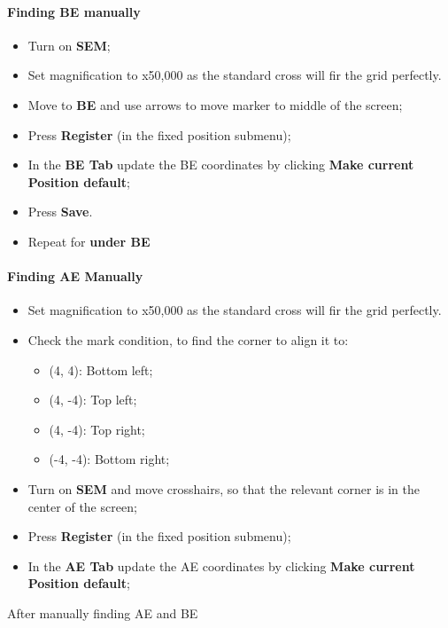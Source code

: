 \paragraph{Finding BE manually}
\begin{itemize}
\item Turn on \textbf{SEM};
  \item Set magnification to x50,000 as the standard cross will fir the grid perfectly.
\item Move to \textbf{BE} and use arrows to move marker to middle of the screen;
\item Press \textbf{Register} (in the fixed position submenu);
\item In the \textbf{BE Tab} update  the BE coordinates by clicking \textbf{Make
    current Position default};
\item Press \textbf{Save}.
\item Repeat for \textbf{under BE}
\end{itemize}

\paragraph{Finding AE Manually}

\begin{itemize}
\item Set magnification to x50,000 as the standard cross will fir the grid perfectly.
\item Check the mark condition, to find the corner to align it to:
  \begin{itemize}
  \item (4, 4): Bottom left;
  \item (4, -4): Top left;
  \item (4, -4): Top right;
  \item (-4, -4): Bottom right;
  \end{itemize}
\item Turn on  \textbf{SEM} and move crosshairs, so that  the relevant corner is
  in the center of the screen;
\item Press \textbf{Register} (in the fixed position submenu);
\item In the \textbf{AE Tab} update  the AE coordinates by clicking \textbf{Make
    current Position default};
\end{itemize}

\begin{framed}\noindent
  After manually finding AE and  BE 
\end{framed}

